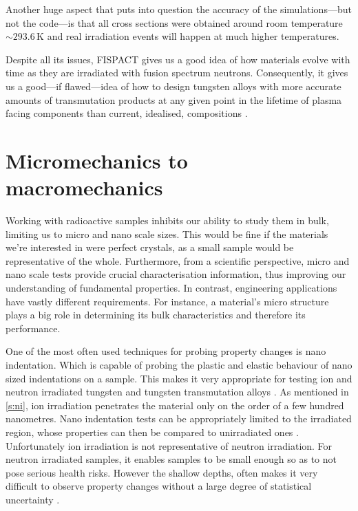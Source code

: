 \documentclass[12pt, a4paper]{article}
\begin{document}
		Another huge aspect that puts into question the accuracy of the simulations---but not the code---is that all cross sections were obtained around room temperature $\sim 293.6\,\textrm{K}$ \cite{transmute2} and real irradiation events will happen at much higher temperatures.
		
		Despite all its issues, FISPACT \cite{fispact} gives us a good idea of how materials evolve with time as they are irradiated with fusion spectrum neutrons. Consequently, it gives us a good---if flawed---idea of how to design tungsten alloys with more accurate amounts of transmutation products at any given point in the lifetime of plasma facing components than current, idealised, compositions \cite{ionirrmic, ionirrprop, ionirrprop2, hardening}.
	\section{Micromechanics to macromechanics}\label{s:mm}
		Working with radioactive samples inhibits our ability to study them in bulk, limiting us to micro and nano scale sizes. This would be fine if the materials we're interested in were perfect crystals, as a small sample would be representative of the whole. Furthermore, from a scientific perspective, micro and nano scale tests provide crucial characterisation information, thus improving our understanding of fundamental properties. In contrast, engineering applications have vastly different requirements. For instance, a material's micro structure plays a big role in determining its bulk characteristics \cite{ionirrmic} and therefore its performance.
		
		One of the most often used techniques for probing property changes is nano indentation. Which is capable of probing the plastic and elastic behaviour of nano sized indentations on a sample. This makes it very appropriate for testing ion and neutron irradiated tungsten and tungsten transmutation alloys \cite{ionirrmic, ionirrprop, ionirrprop2, hardening}. As mentioned in \cref{s:ni}, ion irradiation penetrates the material only on the order of a few hundred nanometres. Nano indentation tests can be appropriately limited to the irradiated region, whose properties can then be compared to unirradiated ones \cite{ionirrprop, ionirrprop2, hardening}. Unfortunately ion irradiation is not representative of neutron irradiation. For neutron irradiated samples, it enables samples to be small enough so as to not pose serious health risks. However the shallow depths, often makes it very difficult to observe property changes without a large degree of statistical uncertainty \cite{ionirrprop, ionirrprop2, hardening}.
		
\end{document}
